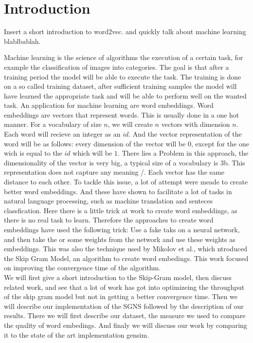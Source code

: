 \chapter{Introduction}\label{chap:introduction}

Insert a short introduction to word2vec. and quickly talk about machine learning blablbablah. 


Machine learning is the science of algorithms the execution of a certain task, for example the classification of images into categories. The goal is that after a training period the model will be able to execute the task. The training is done on a so called training dataset, after sufficient training samples the model will have learned the appropriate task and will be able to perform well on the wanted task. An application for machine learning are word embeddings. Word embeddings are vectors that represent words. This is usually done in a one hot manner. For a vocabulary of size $n$, we will create $n$ vectors with dimension $n$. Each word will recieve an integer as an $id$. And the vector representation of the word will be as follows: every dimension of the vector will be $0$, except for the one wich is equal to the $id$ which will be $1$. There lies a Problem in this approach, the dimensionality of the vector is very big, a typical size of a vocabulary is 3b. This representation does not capture any meaning /. Each vector has the same distance to each other. To tackle this issue, a lot of attempt were meade to create better word embeddings. And these have shown to facilitate a lot of tasks in natural language processing, such as machine translation and senteces classfication. Here there is a little trick at work to create word embeddings, as there is no real task to learn. Therefore the approaches to create word embeddings have used the following trick: Use a fake taks on a neural network, and then take the or some weights from the network and use these weights as embeddings. This was also the technique used by Mikolov et al., which ntroduced the Skip Gram Model, an algorithm to create word embedings. 
This work focused on improving the convergence time of the algorithm. \\
We will first give a short introduction to the Skip-Gram model, then discuss related work, and see that a lot of work has got into optimizeing the throughput of the skip gram model but not in getting a better convergence time. Then we will describe our implementation of the SGNS followed by the description of our results. There we will first describe our dataset, the measure we used to compare the quality of word embedings. And finaly we will discuss our work by comparing it to the state of the art implementation gensim. 

  














